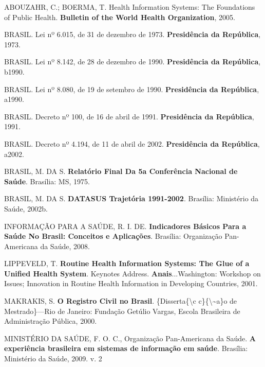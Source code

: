\documentclass[
  letterpaper,
  DIV=11,
  numbers=noendperiod]{scrreprt}
\newlength{\cslhangindent}
\newenvironment{CSLReferences}[2] %
 {\begin{list}{}{%
  \setlength{\itemindent}{0pt}
  \setlength{\leftmargin}{0pt}
  \setlength{\parsep}{0pt}
  \ifodd #1
   \setlength{\leftmargin}{\cslhangindent}
   \setlength{\itemindent}{-1\cslhangindent}
  \fi
  \setlength{\itemsep}{#2\baselineskip}}}
 {\end{list}}
\begin{document}
\begin{CSLReferences}{0}{1}
ABOUZAHR, C.; BOERMA, T. Health Information Systems: The Foundations of
Public Health. \textbf{Bulletin of the World Health Organization}, 2005.

BRASIL. Lei nº 6.015, de 31 de dezembro de 1973. \textbf{Presidência da
República}, 1973.

BRASIL. Lei nº 8.142, de 28 de dezembro de 1990. \textbf{Presidência da
República}, b1990.

BRASIL. Lei nº 8.080, de 19 de setembro de 1990. \textbf{Presidência da
República}, a1990.

BRASIL. Decreto nº 100, de 16 de abril de 1991. \textbf{Presidência da
República}, 1991.

BRASIL. Decreto nº 4.194, de 11 de abril de 2002. \textbf{Presidência da
República}, a2002.

BRASIL, M. DA S. \textbf{Relat{ó}rio {Final} Da 5a {Confer{ê}ncia
Nacional} de {Sa{ú}de}}. Bras{í}lia: MS, 1975.

BRASIL, M. DA S. \textbf{{DATASUS} {Trajet{ó}ria} 1991-2002}.
Bras{í}lia: Minist{é}rio da Sa{ú}de, 2002b.

INFORMAÇÃO PARA A SAÚDE, R. I. DE. \textbf{Indicadores B{á}sicos Para a
Sa{ú}de No {Brasil}: Conceitos e Aplica{ç}{õ}es}. Bras{í}lia:
Organiza{ç}{ã}o Pan-Americana da Sa{ú}de, 2008.

LIPPEVELD, T. \textbf{Routine Health Information Systems: The Glue of a
Unified Health System}. Keynotes Address. \textbf{Anais}...Washington:
Workshop on Issues; Innovation in Routine Health Information in
Developing Countries, 2001.

MAKRAKIS, S. \textbf{{O Registro Civil no Brasil}}.
\{Disserta\{\textbackslash c c\}\{\textbackslash\textasciitilde a\}o de
Mestrado\}---Rio de Janeiro: Funda{ç}{ã}o Get{ú}lio Vargas, Escola
Brasileira de Administra{ç}{ã}o P{ú}blica, 2000.

MINISTÉRIO DA SAÚDE, F. O. C., Organização Pan-Americana da Saúde.
\textbf{{A experi{ê}ncia brasileira em sistemas de informa{ç}{ã}o em
sa{ú}de}}. Bras{í}lia: Ministério da Saúde, 2009. v. 2


\end{CSLReferences}
\end{document}
